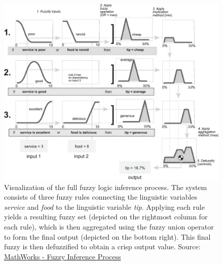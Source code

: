\begin{figure}[H]
      \centering
      \includegraphics[width=1\columnwidth]{figures/TheoreticalBackground/FullInferenceProcess.png}
      \caption[Visualization of the full fuzzy logic inference process.]
      {Visualization of the full fuzzy logic inference process. The system consists of three fuzzy rules connecting the linguistic variables \emph{service} and \emph{food} to the linguistic variable \emph{tip}. Applying each rule yields a resulting fuzzy set (depicted on the rightmost column for each rule), which is then aggregated using the fuzzy union operator to form the final output (depicted on the bottom right). This final fuzzy is then defuzzified to obtain a crisp output value. \small{Source: \href{https://de.mathworks.com/help/fuzzy/fuzzy-inference-process.html}{MathWorks - Fuzzy Inference Process}}}
      \label{fig:fuzzy_inference_full}
\end{figure}